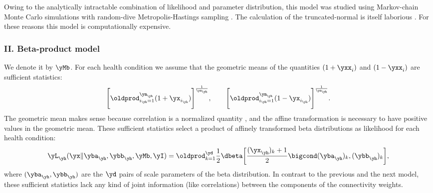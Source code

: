 Owing to the analytically intractable combination of likelihood and
parameter distribution, this model was studied using Markov-chain Monte Carlo
simulations with random-dive Metropolis-Hastings sampling
\citep{dutta2012}. The
calculation of the truncated-normal is itself laborious
\citep{geweke1991,geweke2005}. For these reasons this model is
computationally expensive.

\subsubsection{II. Beta-product model}

We denote it by $\yMb$. For each health condition we assume that the geometric
means of the quantities $(1+\yxx_i)$ and $(1-\yxx_i)$ are sufficient
statistics:
\begin{equation}
  \label{eq:beta_suff_stats}
  \Biggl[ \oldprod_{i_{\yh}=1}^{\yn_{\yh}} (1+\yx_{i_{\yh}})\Biggr]^{\frac{1}{\yn_{\yh}}},
  \qquad
  \Biggl[ \oldprod_{i_{\yh}=1}^{\yn_{\yh}} (1-\yx_{i_{\yh}})\Biggr]^{\frac{1}{\yn_{\yh}}}.
\end{equation}
The geometric mean makes sense because correlation is a
normalized quantity
\citep[\sect~IMD4:9--11]{flemingetal1986,pattersonetal2005}, and the affine
transformation is necessary to have positive values in the geometric mean.
These sufficient statistics select a product of affinely transformed beta
distributions as likelihood for each health condition:
\begin{equation}
  \label{eq:beta_likelihood}
  \yL_{\yh}(\yx \| \yba_{\yh}, \ybb_{\yh}, \yMb, \yI) =
  \oldprod_{k=1}^{\yd} \frac{1}{2}
  \dbeta\biggl[\frac{(\yx_{\yh})_k + 1}{2} \bigcond
  (\yba_{\yh})_k, (\ybb_{\yh})_k\biggr],
\end{equation}
where $(\yba_{\yh}, \ybb_{\yh})$ are the $\yd$ pairs of scale parameters of
the beta distribution. In contrast to the previous and the next model,
these sufficient statistics lack any kind of joint information (like
correlations) between the components of the connectivity weights.

